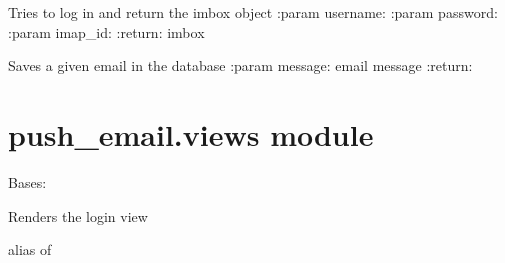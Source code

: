\documentclass[letterpaper,10pt,english]{sphinxmanual}
\begin{document}
\begin{fulllineitems}
\label{push_email:push_email.utils.login}
Tries to log in and return the imbox object
:param username:
:param password:
:param imap\_id:
:return: imbox

\end{fulllineitems}


\begin{fulllineitems}
\label{push_email:push_email.utils.save_email}
Saves a given email in the database
:param message: email message
:return:

\end{fulllineitems}



\section{push\_email.views module}
\label{push_email:module-push_email.views}\label{push_email:push-email-views-module}

\begin{fulllineitems}
\label{push_email:push_email.views.EmailLoginView}
Bases: 

Renders the login view

\begin{fulllineitems}
\label{push_email:push_email.views.EmailLoginView.form_class}
alias of 

\end{fulllineitems}


\begin{fulllineitems}
\label{push_email:push_email.views.EmailLoginView.success_url}
\end{fulllineitems}


\begin{fulllineitems}
\label{push_email:push_email.views.EmailLoginView.template_name}
\end{fulllineitems}


\end{fulllineitems}
\end{document}
